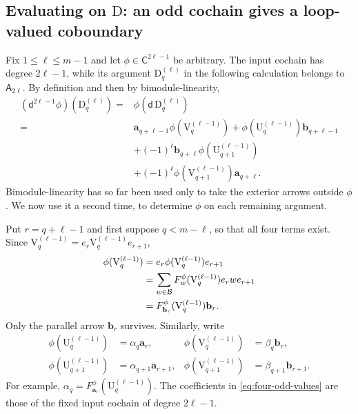 \documentclass[a4paper,11pt,oneside,reqno]{amsart}
\theoremstyle{definition}
\numberwithin{equation}{section}
\begin{document}
	\subsection{Evaluating on \texorpdfstring{$\mathrm{D}$}{D}: an odd cochain gives a loop-valued coboundary}
	\label{subsec:odd-to-even}
	
	Fix $1\leq\ell\leq m-1$ and let $\phi\in \mathsf C^{2\ell-1}$ be arbitrary.
	The input cochain has degree $2\ell-1$, while its argument
	$\mathrm{D}_q^{(\ell)}$ in the following calculation belongs to $\mathsf A_{2\ell}$.
	By definition and then by bimodule-linearity,
	\begin{equation}\label{eq:deltaD-before-values}
		\begin{aligned}
			(\mathsf d^{2\ell-1}\phi)(\mathrm{D}_q^{(\ell)})
			={}&\phi(\mathsf d\,\mathrm{D}_q^{(\ell)})\\
			={}&\mathbf{a}_{q+\ell-1}\phi(\mathrm{V}_q^{(\ell-1)})
			+\phi(\mathrm{U}_q^{(\ell-1)})\mathbf{b}_{q+\ell-1}\\
			&+(-1)^\ell \mathbf{b}_{q+\ell}\phi(\mathrm{U}_{q+1}^{(\ell-1)})\\
			&+(-1)^\ell\phi(\mathrm{V}_{q+1}^{(\ell-1)})\mathbf{a}_{q+\ell}.
		\end{aligned}
	\end{equation}
	Bimodule-linearity has so far been used only to take the exterior
	arrows outside $\phi$.  We now use it a second time, to determine
	$\phi$ on each remaining argument.
	
	Put $r=q+\ell-1$ and first suppose $q<m-\ell$, so that all four terms
	exist.  Since
	$\mathrm{V}_q^{(\ell-1)}=e_r\mathrm{V}_q^{(\ell-1)}e_{r+1}$,
	\begin{align}
		\phi(\mathrm{V}_q^{(\ell-1)})
		&=e_r\phi(\mathrm{V}_q^{(\ell-1)})e_{r+1}\notag\\
		&=\sum_{w\in\mathcal B}F_w^\phi(\mathrm{V}_q^{(\ell-1)})e_rwe_{r+1}\notag\\
		&=F_{\mathbf{b}_r}^\phi(\mathrm{V}_q^{(\ell-1)})\mathbf{b}_r.
		\label{eq:parallel-V-calculation}
	\end{align}
	Only the parallel arrow $\mathbf{b}_r$ survives.  Similarly, write
	\begin{equation}\label{eq:four-odd-values}
		\begin{aligned}
			\phi(\mathrm{U}_q^{(\ell-1)})&=\alpha_q \mathbf{a}_r,&
			\phi(\mathrm{V}_q^{(\ell-1)})&=\beta_q \mathbf{b}_r,\\
			\phi(\mathrm{U}_{q+1}^{(\ell-1)})&=\alpha_{q+1}\mathbf{a}_{r+1},&
			\phi(\mathrm{V}_{q+1}^{(\ell-1)})&=\beta_{q+1}\mathbf{b}_{r+1}.
		\end{aligned}
	\end{equation}
	For example, $\alpha_q=F_{\mathbf{a}_r}^\phi(\mathrm{U}_q^{(\ell-1)})$.
	The coefficients in \eqref{eq:four-odd-values} are those of the fixed
	input cochain of degree $2\ell-1$.
	
\end{document}
